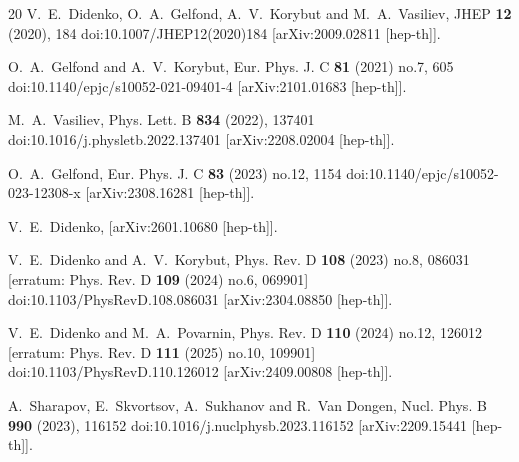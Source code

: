 \documentclass[12pt]{article}
\begin{document}
\begin{thebibliography}{20}
V.~E.~Didenko, O.~A.~Gelfond, A.~V.~Korybut and M.~A.~Vasiliev,
JHEP \textbf{12} (2020), 184
doi:10.1007/JHEP12(2020)184
[arXiv:2009.02811 [hep-th]].

O.~A.~Gelfond and A.~V.~Korybut,
Eur. Phys. J. C \textbf{81} (2021) no.7, 605
doi:10.1140/epjc/s10052-021-09401-4
[arXiv:2101.01683 [hep-th]].

M.~A.~Vasiliev,
Phys. Lett. B \textbf{834} (2022), 137401
doi:10.1016/j.physletb.2022.137401
[arXiv:2208.02004 [hep-th]].

O.~A.~Gelfond,
Eur. Phys. J. C \textbf{83} (2023) no.12, 1154
doi:10.1140/epjc/s10052-023-12308-x
[arXiv:2308.16281 [hep-th]].

V.~E.~Didenko,
[arXiv:2601.10680 [hep-th]].

V.~E.~Didenko and A.~V.~Korybut,
Phys. Rev. D \textbf{108} (2023) no.8, 086031
[erratum: Phys. Rev. D \textbf{109} (2024) no.6, 069901]
doi:10.1103/PhysRevD.108.086031
[arXiv:2304.08850 [hep-th]].

V.~E.~Didenko and M.~A.~Povarnin,
Phys. Rev. D \textbf{110} (2024) no.12, 126012
[erratum: Phys. Rev. D \textbf{111} (2025) no.10, 109901]
doi:10.1103/PhysRevD.110.126012
[arXiv:2409.00808 [hep-th]].

A.~Sharapov, E.~Skvortsov, A.~Sukhanov and R.~Van Dongen,
Nucl. Phys. B \textbf{990} (2023), 116152
doi:10.1016/j.nuclphysb.2023.116152
[arXiv:2209.15441 [hep-th]].


\end{thebibliography}
\end{document}

